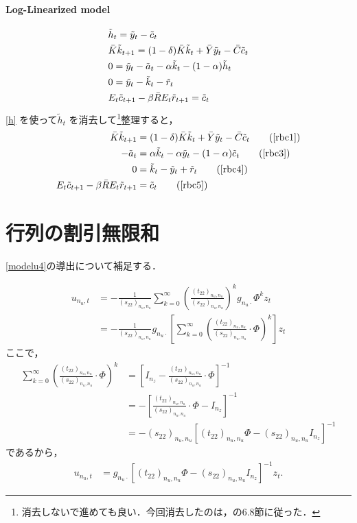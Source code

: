 \documentclass[a4j, dvipdfmx]{jarticle}
\begin{document}
\begin{appendix}
\paragraph{Log-Linearized model}
\begin{align}
&\tilde h_t = \tilde y_t - \tilde c_t\label{h}\\
&\bar K \tilde k_{t+1} = (1-\delta) \bar K \tilde k_t  + \bar Y \tilde y_t - \bar C \tilde c_t\notag\\
&0 = \tilde y_t - \tilde a_t - \alpha \tilde k_t - (1-\alpha) \tilde h_t\notag\\
&0 = \tilde y_t - \tilde k_t - \tilde r_t\notag\\
&E_t\tilde c_{t+1} - \beta \bar R E_t \tilde r_{t+1} = \tilde c_t\notag
\end{align}
\eqref{h} を使って$\tilde h_t$ を消去して\footnote{消去しないで進めても良い．今回消去したのは，\citet{mccan2008:abcs}の6.8節に従った．}整理すると，
\begin{align}
\bar K \tilde k_{t+1} &= (1-\delta) \bar K \tilde k_t  + \bar Y \tilde y_t - \bar C \tilde c_t\tag{\ref{rbc1}}\\
- \tilde a_t &= \alpha \tilde k_t -\alpha \tilde y_t - (1-\alpha) \tilde c_t\tag{\ref{rbc3}}\\
0 &= \tilde k_t - \tilde y_t + \tilde r_t\tag{\ref{rbc4}}\\
E_t\tilde c_{t+1} - \beta \bar R E_t \tilde r_{t+1} &= \tilde c_t\tag{\ref{rbc5}}
\end{align}

\section{行列の割引無限和}
\eqref{modelu4}の導出について補足する．

\begin{align*}
u_{n_u,t} &= - \frac{1}{(s_{22})_{n_u,n_u}} \sum_{k = 0}^\infty \left(\frac{(t_{22})_{n_u,n_u}}{(s_{22})_{n_u,n_u}}\right)^k g_{n_u\cdot}\Phi^k z_t \\
&= - \frac{1}{(s_{22})_{n_u,n_u}} g_{n_u\cdot} \left[\sum_{k = 0}^\infty \left(\frac{(t_{22})_{n_u,n_u}}{(s_{22})_{n_u,n_u}}\cdot\Phi\right)^k\right] z_t
\end{align*}
ここで，
\begin{align*}
\sum_{k = 0}^\infty \left(\frac{(t_{22})_{n_u,n_u}}{(s_{22})_{n_u,n_u}}\cdot\Phi\right)^k &= \left[I_{n_z} - \frac{(t_{22})_{n_u,n_u}}{(s_{22})_{n_u,n_u}}\cdot\Phi\right]^{-1}\\
&= - \left[\frac{(t_{22})_{n_u,n_u}}{(s_{22})_{n_u,n_u}}\cdot\Phi - I_{n_z}\right]^{-1}\\
&= - (s_{22})_{n_u,n_u} \left[(t_{22})_{n_u,n_u}\Phi - (s_{22})_{n_u,n_u} I_{n_z}\right]^{-1}
\end{align*}
であるから，
\begin{align*}
u_{n_u,t} &= g_{n_u\cdot}[(t_{22})_{n_u,n_u}\Phi - (s_{22})_{n_u,n_u}I_{n_z}]^{-1}z_t.
\end{align*}
\end{appendix}
\end{document}

